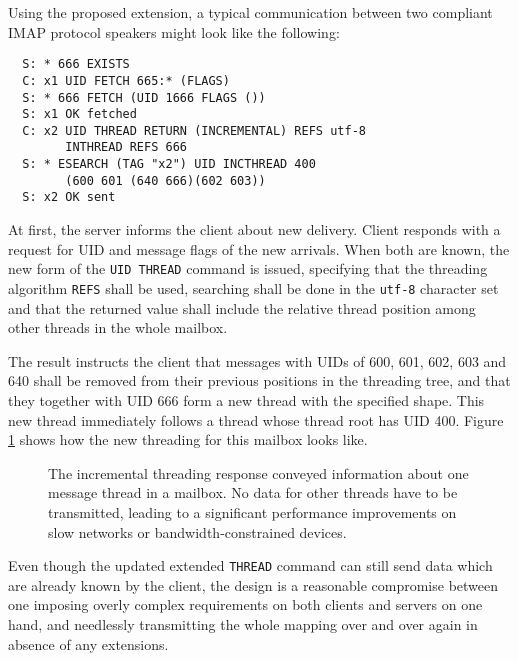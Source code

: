 \documentclass[trojita]{subfiles}
\begin{document}
Using the proposed extension, a typical communication between two compliant IMAP protocol speakers might look like the
following:

\begin{verbatim}
  S: * 666 EXISTS
  C: x1 UID FETCH 665:* (FLAGS)
  S: * 666 FETCH (UID 1666 FLAGS ())
  S: x1 OK fetched
  C: x2 UID THREAD RETURN (INCREMENTAL) REFS utf-8
        INTHREAD REFS 666
  S: * ESEARCH (TAG "x2") UID INCTHREAD 400
        (600 601 (640 666)(602 603))
  S: x2 OK sent
\end{verbatim}

At first, the server informs the client about new delivery.  Client responds with a request for UID and message flags of
the new arrivals.  When both are known, the new form of the {\tt UID THREAD} command is issued, specifying that the
threading algorithm {\tt REFS} shall be used, searching shall be done in the {\tt utf-8} character set and that the
returned value shall include the relative thread position among other threads in the whole mailbox.

The result instructs the client that messages with UIDs of 600, 601, 602, 603 and 640 shall be removed from their
previous positions in the threading tree, and that they together with UID 666 form a new thread with the specified
shape.  This new thread immediately follows a thread whose thread root has UID 400.  Figure
\ref{fig:incthread-threading-example} shows how the new threading for this mailbox looks like.

\begin{figure}
\vspace{10mm}
\vspace{8mm}
  \label{fig:incthread-threading-example}
  \caption{The incremental threading response conveyed information about one message thread in a mailbox.  No data for
  other threads have to be transmitted, leading to a significant performance improvements on slow networks or
  bandwidth-constrained devices.}
\end{figure}

Even though the updated extended {\tt THREAD} command can still send data which are already known by the client, the
design is a reasonable compromise between one imposing overly complex requirements on both clients and servers on one
hand, and needlessly transmitting the whole mapping over and over again in absence of any extensions.
\end{document}
